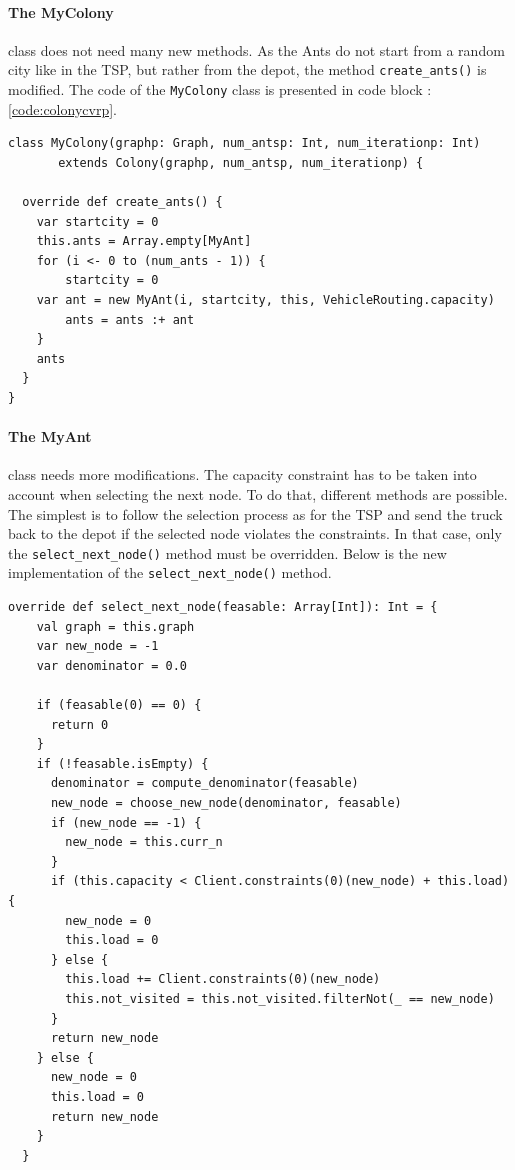 \paragraph{The MyColony} class does not need many new methods. As the Ants do not start from a random city like in the TSP, but rather from the depot, the method \texttt{create\_ants()} is modified. The code of the \texttt{MyColony} class is presented in code block : \ref{code:colonycvrp}.

\begin{lstlisting}[captionpos=b, caption = MyColony implementation for a CVRP, label= code:colonycvrp]
class MyColony(graphp: Graph, num_antsp: Int, num_iterationp: Int) 
       extends Colony(graphp, num_antsp, num_iterationp) {

  override def create_ants() {
    var startcity = 0
    this.ants = Array.empty[MyAnt]
    for (i <- 0 to (num_ants - 1)) {
        startcity = 0
    var ant = new MyAnt(i, startcity, this, VehicleRouting.capacity)
        ants = ants :+ ant
    }
    ants
  }
}
\end{lstlisting}
\paragraph{The MyAnt} class needs more modifications. The capacity constraint has to be taken into account when selecting the next node. To do that, different methods are possible. The simplest is to follow the selection process as for the TSP and send the truck back to the depot if the selected node violates the constraints. In that case, only the \texttt{select\_next\_node()} method must be overridden. Below is the new implementation of the \texttt{select\_next\_node()} method.
\begin{lstlisting}[captionpos=b, caption = MyAnt implementation for a CVRP, label= code:antcvrp]
override def select_next_node(feasable: Array[Int]): Int = {
    val graph = this.graph
    var new_node = -1
    var denominator = 0.0

    if (feasable(0) == 0) { 
      return 0
    }
    if (!feasable.isEmpty) {
      denominator = compute_denominator(feasable)
      new_node = choose_new_node(denominator, feasable)
      if (new_node == -1) {
        new_node = this.curr_n
      }
      if (this.capacity < Client.constraints(0)(new_node) + this.load) {
        new_node = 0
        this.load = 0
      } else {
        this.load += Client.constraints(0)(new_node)
        this.not_visited = this.not_visited.filterNot(_ == new_node)
      }
      return new_node
    } else {
      new_node = 0
      this.load = 0
      return new_node
    }
  }
\end{lstlisting}

